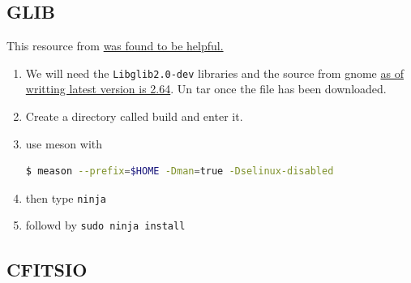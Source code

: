 \documentclass{article}
\begin{document}
\subsection{GLIB}
   This resource from \href{http://www.linuxfromscratch.org/blfs/view/svn/general/glib2.html}{was found to be helpful.}
\begin{enumerate}
    \item We will need the \texttt{Libglib2.0-dev} libraries and the source from gnome \href{http://ftp.gnome.org/pub/gnome/sources/glib/2.64/glib-2.64.3.tar.xz}{as of writting latest version is 2.64}. Un tar once the file has been downloaded.  
    \item Create a directory called build and enter it.
    \item use meson with \begin{lstlisting}[language=bash]
    $ meason --prefix=$HOME -Dman=true -Dselinux-disabled
    \end{lstlisting}
    \item then type \texttt{ninja}
    \item followd by \texttt{sudo ninja install}
\end{enumerate}
         
\subsection{CFITSIO}
\end{document}
